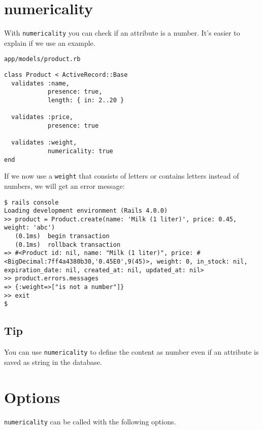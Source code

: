 \documentclass[a4paper]{book}
\newcounter{tab}[chapter]
\begin{document}
\section{numericality}\label{numericality}

With \texttt{numericality} you can check if an attribute is a number. It's easier to explain if we use an example.

\texttt{app/models/product.rb}

\begin{shaded}\begin{verbatim}
class Product < ActiveRecord::Base
  validates :name,
            presence: true,
            length: { in: 2..20 }

  validates :price,
            presence: true

  validates :weight,
            numericality: true
end
\end{verbatim}\end{shaded}

If we now use a \texttt{weight} that consists of letters or contains letters instead of numbers, we will get an error message:

\begin{shaded}\begin{verbatim}
$ rails console
Loading development environment (Rails 4.0.0)
>> product = Product.create(name: 'Milk (1 liter)', price: 0.45, weight: 'abc')
   (0.1ms)  begin transaction
   (0.1ms)  rollback transaction
=> #<Product id: nil, name: "Milk (1 liter)", price: #<BigDecimal:7ff4a4380b30,'0.45E0',9(45)>, weight: 0, in_stock: nil, expiration_date: nil, created_at: nil, updated_at: nil>
>> product.errors.messages
=> {:weight=>["is not a number"]}
>> exit
$
\end{verbatim}\end{shaded}

\subsection{Tip}\label{tip-10}

You can use \texttt{numericality} to define the content as number even if an attribute is saved as string in the database.

\section{Options}\label{options-4}

\texttt{numericality} can be called with the following options.
\end{document}
